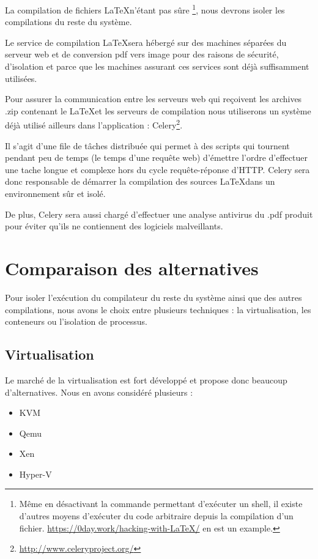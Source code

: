 \documentclass[10pt,a4paper]{article}
\begin{document}
La compilation de fichiers \LaTeX n'étant pas sûre \footnote{Même en désactivant la commande permettant d'exécuter un shell, il existe d'autres moyens d'exécuter du code arbitraire depuis la compilation d'un fichier.  \url{https://0day.work/hacking-with-LaTeX/} en est un example.}, nous devrons isoler les compilations du reste du système.

Le service de compilation \LaTeX sera hébergé sur des machines séparées du serveur web et de conversion pdf vers image pour des raisons de sécurité, d'isolation et parce que les machines assurant ces services sont déjà suffisamment utilisées.

Pour assurer la communication entre les serveurs web qui reçoivent les archives .zip contenant le \LaTeX et les serveurs de compilation nous utiliserons un système déjà utilisé ailleurs dans l'application :
Celery\footnote{\url{http://www.celeryproject.org/}}.

Il s'agit d'une file de tâches distribuée qui permet à des scripts qui tournent pendant peu de temps (le temps d'une requête web) d'émettre l'ordre d'effectuer une tache longue et complexe hors du cycle requête-réponse d'HTTP.
Celery sera donc responsable de démarrer la compilation des sources \LaTeX dans un environnement sûr et isolé.

De plus, Celery sera aussi chargé d'effectuer une analyse antivirus du .pdf produit pour éviter qu'ils ne contiennent des logiciels malveillants.

\section{Comparaison des alternatives}
Pour isoler l'exécution du compilateur du reste du système ainsi que des autres compilations, nous avons le choix entre plusieurs techniques : la virtualisation, les conteneurs ou l'isolation de processus.

\subsection{Virtualisation}

Le marché de la virtualisation est fort développé et propose donc beaucoup d'alternatives. Nous en avons considéré plusieurs :

\begin{itemize}
    \item{KVM}
    \item{Qemu}
    \item{Xen}
    \item{Hyper-V}
\end{itemize}
\end{document}

